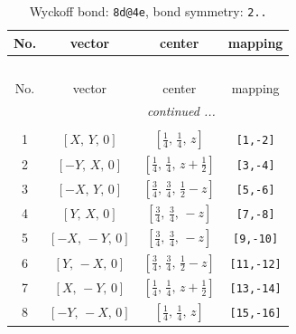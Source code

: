\documentclass[fleqn,8pt]{jsarticle}
\begin{document}
\begin{longtable}{cccc}
\caption{Wyckoff bond: {\tt 8d@4e}, bond symmetry: {\tt 2..}}
 \\
 \hline \hline
No. & vector & center & mapping \\ \hline \endfirsthead

\multicolumn{3}{l}{\tablename\ \thetable{}} \\
 \hline \hline
No. & vector & center & mapping \\ \hline \endhead

 \hline \hline
\multicolumn{3}{r}{\footnotesize\it continued ...} \\ \endfoot

 \hline \hline
\multicolumn{3}{r}{} \\ \endlastfoot

1 & $\left[ X,\, Y,\, 0 \right]$ & $\left[ \frac{1}{4},\, \frac{1}{4},\, z \right]$ & {\tt [1,-2]} \\ \hline
2 & $\left[ - Y,\, X,\, 0 \right]$ & $\left[ \frac{1}{4},\, \frac{1}{4},\, z + \frac{1}{2} \right]$ & {\tt [3,-4]} \\ \hline
3 & $\left[ - X,\, Y,\, 0 \right]$ & $\left[ \frac{3}{4},\, \frac{3}{4},\, \frac{1}{2} - z \right]$ & {\tt [5,-6]} \\ \hline
4 & $\left[ Y,\, X,\, 0 \right]$ & $\left[ \frac{3}{4},\, \frac{3}{4},\, - z \right]$ & {\tt [7,-8]} \\ \hline
5 & $\left[ - X,\, - Y,\, 0 \right]$ & $\left[ \frac{3}{4},\, \frac{3}{4},\, - z \right]$ & {\tt [9,-10]} \\ \hline
6 & $\left[ Y,\, - X,\, 0 \right]$ & $\left[ \frac{3}{4},\, \frac{3}{4},\, \frac{1}{2} - z \right]$ & {\tt [11,-12]} \\ \hline
7 & $\left[ X,\, - Y,\, 0 \right]$ & $\left[ \frac{1}{4},\, \frac{1}{4},\, z + \frac{1}{2} \right]$ & {\tt [13,-14]} \\ \hline
8 & $\left[ - Y,\, - X,\, 0 \right]$ & $\left[ \frac{1}{4},\, \frac{1}{4},\, z \right]$ & {\tt [15,-16]} \\
\end{longtable}
\renewcommand{\arraystretch}{1.2}
\end{document}

